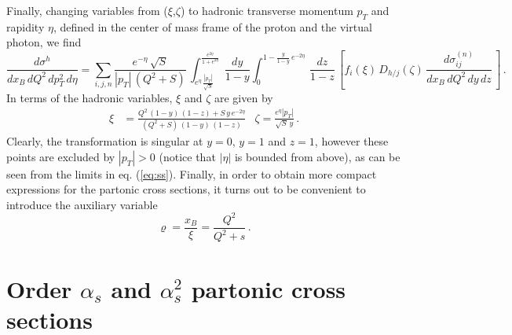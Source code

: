 \documentclass[superscriptaddress,showkeys,showpacs]{revtex4}
\begin{document}
Finally, changing variables from ($\xi$,$\zeta$) to hadronic transverse momentum $p_T$ and rapidity $\eta$, defined in the center of mass frame of the 
proton and the virtual photon, we find
\begin{equation}\label{eq:ss}
\frac{d\sigma^{h}}{dx_B\,dQ^2\,dp_T^2\,d\eta}=\sum_{i,j,n}\frac{e^{-\eta}\,\sqrt{S}}
{|p_T|\,(Q^2+S)}\,
\int_{e^\eta\,\frac{|p_T|}{\sqrt{S}}}
^{\frac{e^{2\eta}}{1+e^{2\eta}}}\,\frac{dy}{1-y}
\int_0^{1-\frac{y}{1-y}\,e^{-2\eta}}\,\frac{dz}{1-z}\,%
\left[f_i(\xi)\,D_{h/j}(\zeta)\,\frac{
d\sigma^{(n)}_{ij}}{dx_B\,dQ^2\,dy\,dz}\,\right]\,.
\end{equation}
In terms of the hadronic variables, $\xi$ and $\zeta$ are given by
\begin{align}
\xi&=\frac{Q^2\,(1-y)\,(1-z)+S\,y\,e^{-2\eta}}{(Q^2+S)\,(1-y)\,(1-z)} &
\zeta=\frac{e^{\eta}|p_T|}{\sqrt{S}\,y} \,.
\end{align}
Clearly, the transformation is singular at $y=0$, $y=1$ and $z=1$, however 
these points are excluded by  $|p_T|>0$ (notice that $|\eta|$ is bounded 
from above),
as can be seen from the limits in eq. (\ref{eq:ss}). Finally, in order 
to obtain
more compact expressions for the partonic cross sections, it turns out to be 
convenient to introduce the auxiliary variable
\begin{equation}
\varrho=\frac{x_B}{\xi}=\frac{Q^2}{Q^2+s}\,.
\end{equation}



\section{Order $\alpha_s$ and  $\alpha_s^2$ partonic cross sections}
\end{document}

